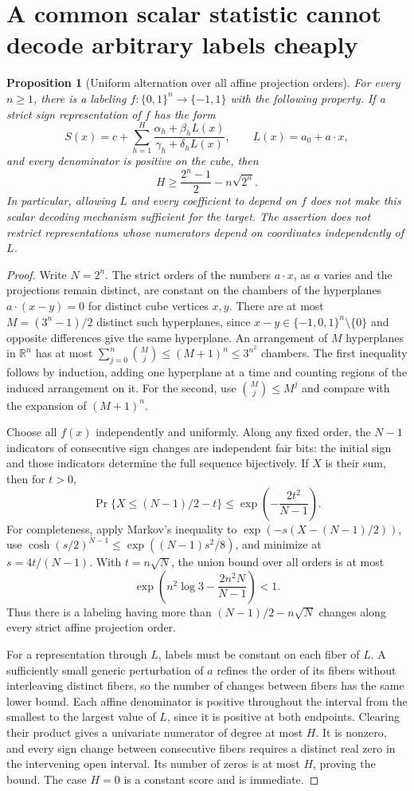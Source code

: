 \documentclass[11pt]{article}
\newtheorem{proposition}{Proposition}
\newcommand{\Qn}{\{0,1\}^n}
\begin{document}
\section{A common scalar statistic cannot decode arbitrary labels cheaply}

\begin{proposition}[Uniform alternation over all affine projection orders]
For every $n\ge1$, there is a labeling $f:\Qn\to\{-1,1\}$ with the
following property. If a strict sign representation of $f$ has the form
\[
 S(x)=c+\sum_{h=1}^H
       \frac{\alpha_h+\beta_h L(x)}{\gamma_h+\delta_h L(x)},
 \qquad L(x)=a_0+a\cdot x,
\]
and every denominator is positive on the cube, then
\[
 H\ge \frac{2^n-1}{2}-n\sqrt{2^n}.
\]
In particular, allowing $L$ and every coefficient to depend on $f$
does not make this scalar decoding mechanism sufficient for the target.
The assertion does not restrict representations whose numerators depend
on coordinates independently of $L$.
\end{proposition}
\begin{proof}
Write $N=2^n$. The strict orders of the numbers $a\cdot x$, as $a$
varies and the projections remain distinct, are constant on the chambers
of the hyperplanes $a\cdot(x-y)=0$ for distinct cube vertices $x,y$.
There are at most $M=(3^n-1)/2$ distinct such hyperplanes, since
$x-y\in\{-1,0,1\}^n\setminus\{0\}$ and opposite differences give
the same hyperplane. An arrangement of $M$ hyperplanes in $\mathbb R^n$
has at most $\sum_{j=0}^n\binom Mj\le(M+1)^n\le3^{n^2}$ chambers.
The first inequality follows by induction, adding one hyperplane at a
time and counting regions of the induced arrangement on it. For the
second, use $\binom Mj\le M^j$ and compare with the expansion of
$(M+1)^n$.

Choose all $f(x)$ independently and uniformly. Along any fixed order,
the $N-1$ indicators of consecutive sign changes are independent fair
bits: the initial sign and those indicators determine the full sequence
bijectively. If $X$ is their sum, then for $t>0$,
\[
 \Pr\{X\le(N-1)/2-t\}\le
             \exp\left(-\frac{2t^2}{N-1}\right).
\]
For completeness, apply Markov's inequality to
$\exp(-s(X-(N-1)/2))$, use
$\cosh(s/2)^{N-1}\le\exp((N-1)s^2/8)$, and minimize at
$s=4t/(N-1)$. With $t=n\sqrt N$, the union bound over all orders
is at most
\[
 \exp\left(n^2\log3-\frac{2n^2N}{N-1}\right)<1.
\]
Thus there is a labeling having more than $(N-1)/2-n\sqrt N$
changes along every strict affine projection order.

For a representation through $L$, labels must be constant on each
fiber of $L$. A sufficiently small generic perturbation of $a$ refines
the order of its fibers without interleaving distinct fibers, so the
number of changes between fibers has the same lower bound.
Each affine denominator is positive throughout the interval from the
smallest to the largest value of $L$, since it is positive at both
endpoints. Clearing their product gives a univariate numerator of
degree at most $H$. It is nonzero, and every sign change between
consecutive fibers requires a distinct real zero in the intervening
open interval. Its number of zeros is at most $H$, proving the bound.
The case $H=0$ is a constant score and is immediate.
\end{proof}
\end{document}
